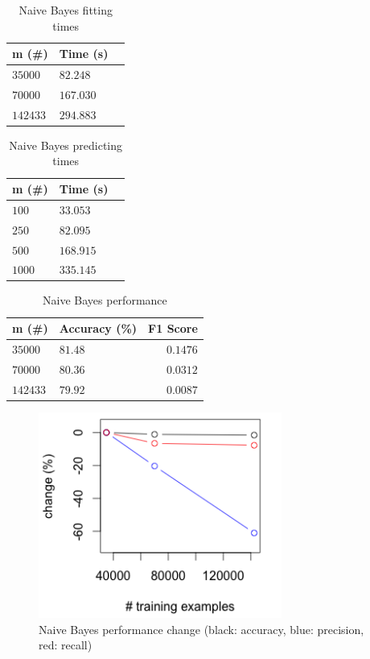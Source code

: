 \documentclass[twoside]{article}
\begin{document}
\begin{multicols}{2}
\begin{table}[H]
\caption{Naive Bayes fitting times}
\centering
\begin{tabular}{llr}
\toprule
m (\#) & Time (s) \\
\midrule
$35000$ & $82.248$ \\
$70000$ & $167.030$ \\
$142433$ & $294.883$ \\
\bottomrule
\end{tabular}
\end{table}

\begin{table}[H]
\caption{Naive Bayes predicting times}
\centering
\begin{tabular}{llr}
\toprule
m (\#) & Time (s) \\
\midrule
$100$ & $33.053$ \\
$250$ & $82.095$ \\
$500$ & $168.915$ \\
$1000$ & $335.145$ \\
\bottomrule
\end{tabular}
\end{table}

\begin{table}[H]
\caption{Naive Bayes performance}
\centering
\begin{tabular}{llr}
\toprule
m (\#) & Accuracy (\%) & F1 Score \\
\midrule
$35000$ & $81.48$ & $0.1476$ \\
$70000$ & $80.36$ & $0.0312$ \\
$142433$ & $79.92$ & $0.0087$ \\
\bottomrule
\end{tabular}
\end{table}

\begin{figure}[H]
 \caption{Naive Bayes performance change (black: accuracy, blue: precision, red: recall)}
  \centering
    \includegraphics[width=8cm]{../data/nb_change}
\end{figure}



\end{multicols}
\end{document}
